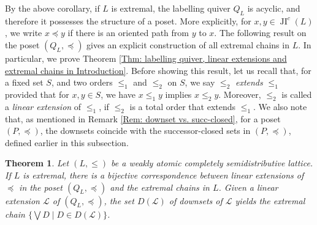 \documentclass{amsart}
\theoremstyle{thmstyle}
\newtheorem{theorem}[thm]{Theorem}
\theoremstyle{exstyle}
\theoremstyle{defstyle}
\theoremstyle{remstyle}
\theoremstyle{remstyle}
\DeclareMathOperator*{\JI}{JI}
\begin{document}
By the above corollary, if $L$ is extremal, the labelling quiver $Q_L$  is acyclic, and therefore it possesses the structure of a poset. More explicitly, for $x, y \in \JI^c(L)$, we write $x \preceq y$ if there is an oriented path from $y$ to $x$. The following result on the poset $(Q_L, \preceq)$ gives an explicit construction of all extremal chains in $L$. 
In particular, we prove Theorem \ref{Thm: labelling quiver, linear extensions and extremal chains in Introduction}. 
Before showing this result, let us recall that, for a fixed set $S$, and two orders $\le_1$ and $\le_2$ on $S$, we say $\le_2$ \emph{extends} $\le_1$ provided that for $x, y \in S$, we have $x \le_1 y$ implies $x \le_2 y$. Moreover, $\le_2$ is called a \emph{linear extension} of $\le_1$, if $\le_2$ is a total order that extends $\le_1$. We also note that, as mentioned in Remark \ref{Rem: downset vs. succ-closed}, for a poset $(P,\preceq)$, the downsets coincide with the successor-closed sets in $(P,\preceq)$, defined earlier in this subsection.

\begin{theorem}\label{Thm: labelling quiver, linear extensions and extremal chains}
Let $(L,\leq)$ be a weakly atomic completely semidistributive lattice. 
If $L$ is extremal, there is a bijective correspondence between linear extensions of $\preceq$ in the poset $(Q_L, \preceq)$ and the extremal chains in $L$. 
Given a linear extension $\mathcal{L}$ of $(Q_L, \preceq)$, the set $D(\mathcal{L})$ of downsets of $\mathcal{L}$ yields the extremal chain $\{\bigvee D\mid D \in D(\mathcal{L})\}$.
\end{theorem}
\end{document}
